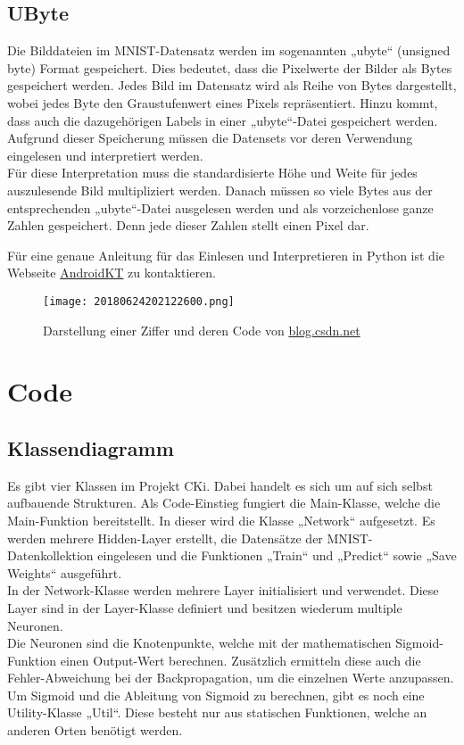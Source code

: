 \subsection{UByte}
\label{sec:UByte}
Die Bilddateien im MNIST-Datensatz werden im sogenannten „ubyte“ (unsigned byte) Format gespeichert. Dies bedeutet, dass die Pixelwerte der Bilder als Bytes gespeichert werden. Jedes Bild im Datensatz wird als Reihe von Bytes dargestellt, wobei jedes Byte den Graustufenwert eines Pixels repräsentiert. Hinzu kommt, dass auch die dazugehörigen Labels in einer „ubyte“-Datei gespeichert werden.
\\
Aufgrund dieser Speicherung müssen die Datensets vor deren Verwendung eingelesen und interpretiert werden. 
\\
Für diese Interpretation muss die standardisierte Höhe und Weite für jedes auszulesende Bild multipliziert werden. Danach müssen so viele Bytes aus der entsprechenden „ubyte“-Datei ausgelesen werden und als vorzeichenlose ganze Zahlen gespeichert. Denn jede dieser Zahlen stellt einen Pixel dar.

Für eine genaue Anleitung für das Einlesen und Interpretieren in Python ist die Webseite \href{https://androidkt.com/extract-images-from-mnist-idx3-ubyte-file-format-in-python/}{AndroidKT} zu kontaktieren.

\begin{figure}[H]
	\centering
	\texttt{[image: 20180624202122600.png]}
	\caption{Darstellung einer Ziffer und deren Code von \href{https://blog.csdn.net/qq_41185868/article/details/79094752}{blog.csdn.net}}
	\label{fig:designubytecomp}
\end{figure}



\section{Code}
\label{sec:DesignCode}
\subsection{Klassendiagramm}
\label{sec:DesignKlassendiagramm}
Es gibt vier Klassen im Projekt CKi. Dabei handelt es sich um auf sich selbst aufbauende Strukturen. Als Code-Einstieg fungiert die Main-Klasse, welche die Main-Funktion bereitstellt. In dieser wird die Klasse „Network“ aufgesetzt. Es werden mehrere Hidden-Layer erstellt, die Datensätze der MNIST-Datenkollektion eingelesen und die Funktionen „Train“ und „Predict“ sowie „Save Weights“ ausgeführt. 
\\
In der Network-Klasse werden mehrere Layer initialisiert und verwendet. Diese Layer sind in der Layer-Klasse definiert und besitzen wiederum multiple Neuronen.
\\
Die Neuronen sind die Knotenpunkte, welche mit der mathematischen Sigmoid-Funktion einen Output-Wert berechnen. Zusätzlich ermitteln diese auch die Fehler-Abweichung bei der Backpropagation, um die einzelnen Werte anzupassen.
\\
Um Sigmoid und die Ableitung von Sigmoid zu berechnen, gibt es noch eine Utility-Klasse „Util“. Diese besteht nur aus statischen Funktionen, welche an anderen Orten benötigt werden.


